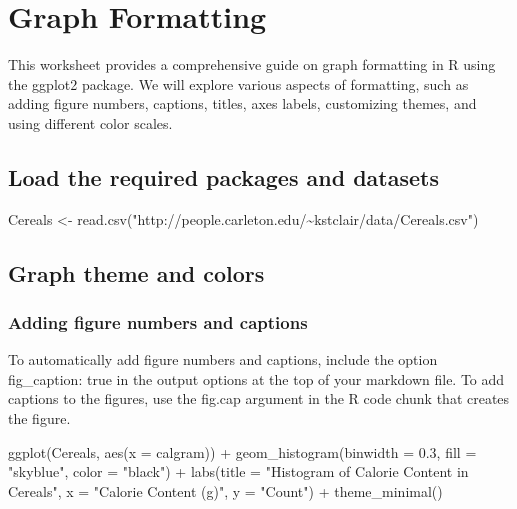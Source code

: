 \documentclass[
]{book}
\newenvironment{Shaded}{\begin{snugshade}}{\end{snugshade}}
\newcommand{\AttributeTok}[1]{\textcolor[rgb]{0.77,0.63,0.00}{#1}}
\newcommand{\FloatTok}[1]{\textcolor[rgb]{0.00,0.00,0.81}{#1}}
\newcommand{\FunctionTok}[1]{\textcolor[rgb]{0.00,0.00,0.00}{#1}}
\newcommand{\NormalTok}[1]{#1}
\newcommand{\OtherTok}[1]{\textcolor[rgb]{0.56,0.35,0.01}{#1}}
\newcommand{\SpecialCharTok}[1]{\textcolor[rgb]{0.00,0.00,0.00}{#1}}
\newcommand{\StringTok}[1]{\textcolor[rgb]{0.31,0.60,0.02}{#1}}
\begin{document}
\hypertarget{graph-formatting}{%
\chapter{Graph Formatting}\label{graph-formatting}}

This worksheet provides a comprehensive guide on graph formatting in R using the ggplot2 package. We will explore various aspects of formatting, such as adding figure numbers, captions, titles, axes labels, customizing themes, and using different color scales.

\hypertarget{load-the-required-packages-and-datasets}{%
\section{Load the required packages and datasets}\label{load-the-required-packages-and-datasets}}

\begin{Shaded}
\begin{Highlighting}[]
\NormalTok{Cereals }\OtherTok{\textless{}{-}} \FunctionTok{read.csv}\NormalTok{(}\StringTok{"http://people.carleton.edu/\textasciitilde{}kstclair/data/Cereals.csv"}\NormalTok{)}
\end{Highlighting}
\end{Shaded}

\hypertarget{graph-theme-and-colors}{%
\section{Graph theme and colors}\label{graph-theme-and-colors}}

\hypertarget{adding-figure-numbers-and-captions}{%
\subsection{Adding figure numbers and captions}\label{adding-figure-numbers-and-captions}}

To automatically add figure numbers and captions, include the option fig\_caption: true in the output options at the top of your markdown file. To add captions to the figures, use the fig.cap argument in the R code chunk that creates the figure.

\begin{Shaded}
\begin{Highlighting}[]
\FunctionTok{ggplot}\NormalTok{(Cereals, }\FunctionTok{aes}\NormalTok{(}\AttributeTok{x =}\NormalTok{ calgram)) }\SpecialCharTok{+}
  \FunctionTok{geom\_histogram}\NormalTok{(}\AttributeTok{binwidth =} \FloatTok{0.3}\NormalTok{, }\AttributeTok{fill =} \StringTok{"skyblue"}\NormalTok{, }\AttributeTok{color =} \StringTok{"black"}\NormalTok{) }\SpecialCharTok{+}
  \FunctionTok{labs}\NormalTok{(}\AttributeTok{title =} \StringTok{"Histogram of Calorie Content in Cereals"}\NormalTok{,}
       \AttributeTok{x =} \StringTok{"Calorie Content (g)"}\NormalTok{,}
       \AttributeTok{y =} \StringTok{"Count"}\NormalTok{) }\SpecialCharTok{+}
  \FunctionTok{theme\_minimal}\NormalTok{()}
\end{Highlighting}
\end{Shaded}
\end{document}

